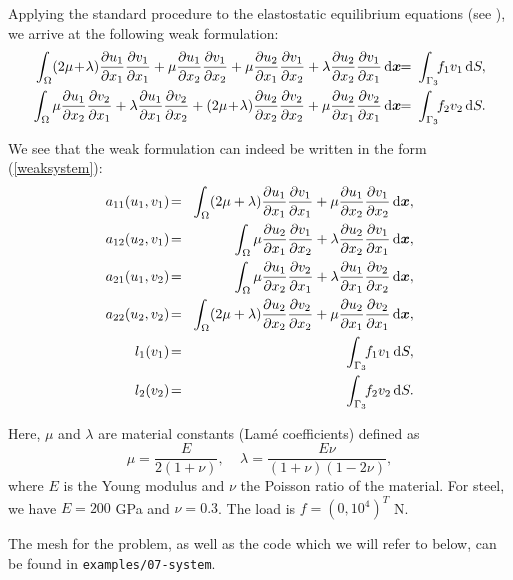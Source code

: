 Applying the standard procedure to the elastostatic equilibrium equations
(see \cite{lifshitz}), we arrive at the following weak formulation:
\begin{eqnarray*}
  \int_\Omega
    (2\mu\!+\!\lambda)\dd{u_1}{x_1}\dd{v_1}{x_1} + \mu\dd{u_1}{x_2}\dd{v_1}{x_2} +
    \mu\dd{u_2}{x_1}\dd{v_1}{x_2} + \lambda\dd{u_2}{x_2}\dd{v_1}{x_1}
    \,\mbox{d}\bfx \!\!&=&\!\!\!
    \int_{\Gamma_3} \!\!f_1 v_1 \,\mbox{d}S, \\ \smallskip
  \int_\Omega
    \mu\dd{u_1}{x_2}\dd{v_2}{x_1} + \lambda\dd{u_1}{x_1}\dd{v_2}{x_2} +
    (2\mu\!+\!\lambda)\dd{u_2}{x_2}\dd{v_2}{x_2} + \mu\dd{u_2}{x_1}\dd{v_2}{x_1}
    \,\mbox{d}\bfx \!\!&=&\!\!\!
    \int_{\Gamma_3} \!\!f_2 v_2 \,\mbox{d}S.
\end{eqnarray*}

We see that the weak formulation can indeed be written in the form (\ref{weaksystem}):
\begin{eqnarray}
  a_{11}(u_1, v_1) \!&=&\! \int_\Omega (2\mu+\lambda)\dd{u_1}{x_1}\dd{v_1}{x_1} + \mu\dd{u_1}{x_2}\dd{v_1}{x_2} \,\mbox{d}\bfx, \label{sysform1} \\
  a_{12}(u_2, v_1) \!&=&\! \int_\Omega \mu\dd{u_2}{x_1}\dd{v_1}{x_2} + \lambda\dd{u_2}{x_2}\dd{v_1}{x_1} \,\mbox{d}\bfx,\\
  a_{21}(u_1, v_2) \!&=&\! \int_\Omega \mu\dd{u_1}{x_2}\dd{v_2}{x_1} + \lambda\dd{u_1}{x_1}\dd{v_2}{x_2} \,\mbox{d}\bfx,\\
  a_{22}(u_2, v_2) \!&=&\! \int_\Omega (2\mu+\lambda)\dd{u_2}{x_2}\dd{v_2}{x_2} + \mu\dd{u_2}{x_1}\dd{v_2}{x_1} \,\mbox{d}\bfx, \label{sysform2} \\
  l_{1}(v_1) \!&=&\!
  \int_{\Gamma_3} \!\!f_1 v_1 \,\mbox{d}S, \\
  l_{2}(v_2) \!&=&\!
  \int_{\Gamma_3} \!\!f_2 v_2 \,\mbox{d}S.  \label{sysform3}
\end{eqnarray}

Here, $\mu$ and $\lambda$ are material constants (Lam\'e coefficients) defined as
$$\mu = \frac{E}{2(1+\nu)}, \ \ \ \ \  \lambda = \frac{E\nu}{(1+\nu)(1-2\nu)},$$
where $E$ is the Young modulus and $\nu$ the Poisson ratio of the material. For
steel, we have $E = 200$ GPa and $\nu = 0.3$. The load is $f = (0, 10^4)^T$ N.

The mesh for the problem, as well as the code which we will refer to below,
can be found in \verb"examples/07-system".

